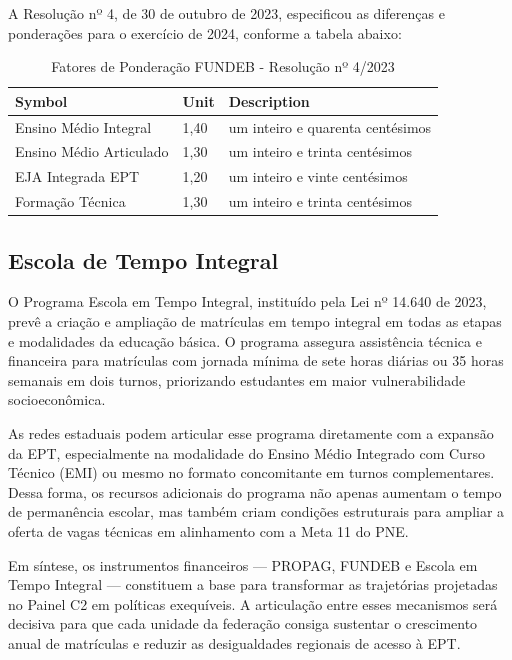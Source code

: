 A Resolução nº 4, de 30 de outubro de 2023, especificou as diferenças e ponderações para o exercício de 2024, conforme a tabela abaixo:

\newenvironment{nomenclature}[1]
{
	\begin{table}[hbt]
		\caption{#1}
		\begin{center}
			\begin{tabular}{|l|l|l|}
				\hline
				\textbf{Symbol} & \textbf{Unit} & \textbf{Description}\\
				\hline
			}
			{
				\\\hline
			\end{tabular}
		\end{center}
	\end{table}
}

\begin{nomenclature}{Fatores de Ponderação FUNDEB - Resolução nº 4/2023}
	Ensino Médio Integral & 1,40 & um inteiro e quarenta centésimos\\
	Ensino Médio Articulado & 1,30 & um inteiro e trinta centésimos\\
	EJA Integrada EPT & 1,20 & um inteiro e vinte centésimos\\
	Formação Técnica & 1,30 & um inteiro e trinta centésimos
\end{nomenclature}

\subsection{Escola de Tempo Integral}

O Programa Escola em Tempo Integral, instituído pela Lei nº 14.640 de 2023, prevê a criação e ampliação de matrículas em tempo integral em todas as etapas e modalidades da educação básica. O programa assegura assistência técnica e financeira para matrículas com jornada mínima de sete horas diárias ou 35 horas semanais em dois turnos, priorizando estudantes em maior vulnerabilidade socioeconômica. 

As redes estaduais podem articular esse programa diretamente com a expansão da EPT, especialmente na modalidade do Ensino Médio Integrado com Curso Técnico (EMI) ou mesmo no formato concomitante em turnos complementares. Dessa forma, os recursos adicionais do programa não apenas aumentam o tempo de permanência escolar, mas também criam condições estruturais para ampliar a oferta de vagas técnicas em alinhamento com a Meta 11 do PNE.

\bigskip

Em síntese, os instrumentos financeiros — PROPAG, FUNDEB e Escola em Tempo Integral — constituem a base para transformar as trajetórias projetadas no Painel C2 em políticas exequíveis. A articulação entre esses mecanismos será decisiva para que cada unidade da federação consiga sustentar o crescimento anual de matrículas e reduzir as desigualdades regionais de acesso à EPT.
